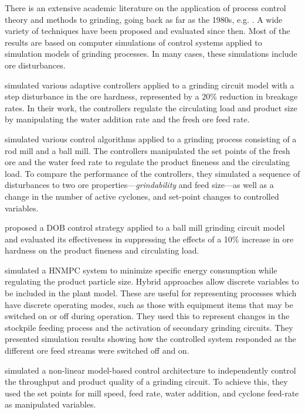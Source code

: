 There is an extensive academic literature on the application of process control theory and methods to grinding, going back as far as the 1980s, e.g. \cite{herbst_optimal_1988}. A wide variety of techniques have been proposed and evaluated since then. Most of the results are based on computer simulations of control systems applied to simulation models of grinding processes. In many cases, these simulations include ore disturbances.

\cite{najim_adaptive_1995} simulated various adaptive controllers applied to a grinding circuit model with a step disturbance in the ore hardness, represented by a 20\% reduction in breakage rates. In their work, the controllers regulate the circulating load and product size by manipulating the water addition rate and the fresh ore feed rate.

\cite{pomerleau_survey_2000} simulated various control algorithms applied to a grinding process consisting of a rod mill and a ball mill. The controllers manipulated the set points of the fresh ore and the water feed rate to regulate the product fineness and the circulating load. To compare the performance of the controllers, they simulated a sequence of disturbances to two ore properties---\textit{grindability} and feed size---as well as a change in the number of active cyclones, and set-point changes to controlled variables.

\cite{chen_disturbance_2009} proposed a \gls{DOB} control strategy applied to a ball mill grinding circuit model and evaluated its effectiveness in suppressing the effects of a 10\% increase in ore hardness on the product fineness and circulating load.

\cite{estrada_hybrid_2014} simulated a \gls{HNMPC} system to minimize specific energy consumption while regulating the product particle size. Hybrid approaches allow discrete variables to be included in the plant model. These are useful for representing processes which have discrete operating modes, such as those with equipment items that may be switched on or off during operation. They used this to represent changes in the stockpile feeding process and the activation of secondary grinding circuits. They presented simulation results showing how the controlled system responded as the different ore feed streams were switched off and on.

\cite{le_roux_throughput_2016} simulated a non-linear model-based control architecture to independently control the throughput and product quality of a grinding circuit. To achieve this, they used the set points for mill speed, feed rate, water addition, and cyclone feed-rate as manipulated variables.

